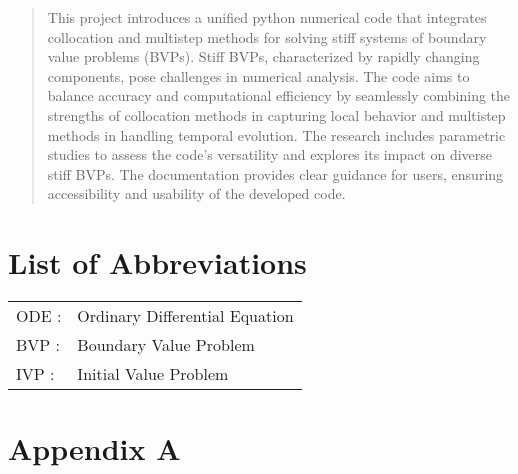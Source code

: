 \documentclass{report}
\begin{document}
\begin{abstract}
    This project introduces a unified python numerical code that integrates collocation and multistep methods for solving stiff systems of boundary value problems (BVPs). Stiff BVPs, characterized by rapidly changing components, pose challenges in numerical analysis. The code aims to balance accuracy and computational efficiency by seamlessly combining the strengths of collocation methods in capturing local behavior and multistep methods in handling temporal evolution. The research includes parametric studies to assess the code's versatility and explores its impact on diverse stiff BVPs. The documentation provides clear guidance for users, ensuring accessibility and usability of the developed code.
    \end{abstract}


\tableofcontents

\listoffigures

\listoftables

\chapter*{List of Abbreviations}
\begin{tabular}{ll}
    ODE : & Ordinary Differential Equation \\
    BVP : & Boundary Value Problem \\
    IVP : & Initial Value Problem \\
\end{tabular}



 







\begin{thebibliography}{9}
  
\end{thebibliography}
                                                                                                                                                                                                                 
\appendix
\chapter{Appendix A}
\end{document}
